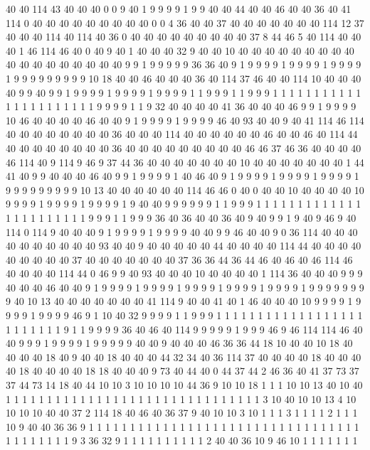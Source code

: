 40 40 114 43 40 40 40 0 0 9 40 1 9 9 9 9 1 9 9 40
40 44 40 40 46 40 40 36 40 41 114 0 40 40 40 40 40 40 40 40
40 0 0 4 36 40 40 37 40 40 40 40 40 40 40 114 12 37 40 40
40 114 40 114 40 36 0 40 40 40 40 40 40 40 40 40 37 8 44 46
5 40 114 40 40 40 1 46 114 46 40 0 40 9 40 1 40 40 40 32
9 40 40 10 40 40 40 40 40 40 40 40 40 40 40 40 40 40 40 40
40 40 9 9 1 9 9 9 9 9 36 36 40 9 1 9 9 9 9 1
9 9 9 9 1 9 9 9 9 1 9 9 9 9 9 9 9 9 9 10
18 40 40 46 40 40 40 36 40 114 37 46 40 40 114 10 40 40 40 40
9 9 40 9 9 1 9 9 9 9 1 9 9 9 9 1 9 9 9 9
1 1 9 9 9 1 1 9 9 9 1 1 1 1 1 1 1 1 1 1
1 1 1 1 1 1 1 1 1 1 1 1 9 9 9 9 1 1 9 32
40 40 40 40 41 36 40 40 40 46 9 9 1 9 9 9 9 10 46 40
40 40 40 46 40 40 9 1 9 9 9 9 1 9 9 9 9 46 40 93
40 40 9 40 41 114 46 114 40 40 40 40 40 40 40 40 36 40 40 40
114 40 40 40 40 40 40 46 40 40 46 40 114 44 40 40 40 40 40 40
40 40 36 40 40 40 40 40 40 40 40 40 46 46 37 46 36 40 40 40
40 46 114 40 9 114 9 46 9 37 44 36 40 40 40 40 40 40 40 10
40 40 40 40 40 40 40 1 44 41 40 9 9 40 40 40 46 40 9 9
1 9 9 9 9 1 40 46 40 9 1 9 9 9 9 1 9 9 9 9
1 9 9 9 9 1 9 9 9 9 9 9 9 9 9 10 13 40 40 40
40 40 40 114 46 46 0 40 0 40 40 10 40 40 40 40 10 9 9 9
9 1 9 9 9 9 1 9 9 9 9 1 9 40 40 9 9 9 9 9
9 1 1 9 9 9 1 1 1 1 1 1 1 1 1 1 1 1 1 1
1 1 1 1 1 1 1 1 1 9 9 9 1 1 9 9 9 36 40 36
40 40 36 40 9 40 9 9 1 9 40 9 46 9 40 114 0 114 9 40
40 40 9 1 9 9 9 9 1 9 9 9 9 40 40 9 9 46 40 40
9 0 36 114 40 40 40 40 40 40 40 40 40 40 93 40 40 9 40 40
40 40 40 44 40 40 40 40 114 44 40 40 40 40 40 40 40 40 40 37
40 40 40 40 40 40 40 37 36 36 44 36 44 46 40 46 40 46 114 46
40 40 40 40 114 44 0 46 9 9 40 93 40 40 40 10 40 40 40 40
1 114 36 40 40 40 9 9 9 40 40 40 46 40 40 9 1 9 9 9
9 1 9 9 9 9 1 9 9 9 9 1 9 9 9 9 1 9 9 9
9 1 9 9 9 9 9 9 9 9 40 10 13 40 40 40 40 40 40 40
41 114 9 40 40 41 40 1 46 40 40 40 10 9 9 9 9 1 9 9
9 9 1 9 9 9 9 46 9 1 10 40 32 9 9 9 9 1 1 9
9 9 1 1 1 1 1 1 1 1 1 1 1 1 1 1 1 1 1 1
1 1 1 1 1 1 1 9 1 1 9 9 9 9 36 40 46 40 114 9
9 9 9 9 1 9 9 9 46 9 46 114 114 46 40 40 9 9 9 1
9 9 9 9 1 9 9 9 9 9 40 40 9 40 40 40 46 36 36 44
18 10 40 40 10 18 40 40 40 40 18 40 9 40 40 18 40 40 40 44
32 34 40 36 114 37 40 40 40 40 18 40 40 40 40 18 40 40 40 40
18 18 40 40 40 9 73 40 44 40 0 44 37 44 2 46 36 40 41 37
73 37 37 44 73 14 18 40 44 10 10 3 10 10 10 10 44 36 9 10
10 18 1 1 1 10 10 13 40 10 40 1 1 1 1 1 1 1 1 1
1 1 1 1 1 1 1 1 1 1 1 1 1 1 1 1 1 1 1 1
1 1 3 10 40 10 10 13 4 10 10 10 10 40 40 37 2 114 18 40
46 40 36 37 9 40 10 10 3 10 1 1 1 3 1 1 1 1 2 1
1 1 10 9 40 40 36 36 9 1 1 1 1 1 1 1 1 1 1 1
1 1 1 1 1 1 1 1 1 1 1 1 1 1 1 1 1 1 1 1
1 1 1 1 1 1 1 1 1 1 9 3 36 32 9 1 1 1 1 1
1 1 1 1 1 2 40 40 36 10 9 46 10 1 1 1 1 1 1 1
